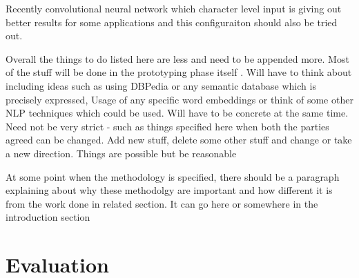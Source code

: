 \documentclass[a4paper, 11pt]{article}
\begin{document}
Recently convolutional neural network which character level input is giving out better results for some applications and this configuraiton should also be tried out.






\color{red}
Overall the things to do listed here are less and need to be appended more. Most of the stuff will be done in the prototyping phase itself . Will have to think about including ideas such as using DBPedia or any semantic database which is precisely expressed, Usage of any specific word embeddings or think of some other NLP techniques which could be used. Will have to be concrete at the same time. Need not be very strict - such as things specified here when both the parties agreed can be changed. Add new stuff, delete some other stuff and change or take a new direction. Things are possible but be reasonable

At some point when the methodology is specified, there should be a paragraph explaining about why these methodolgy are important and how different it is from the work done in related section. It can go here or somewhere in the introduction section
\color{black}

\section{Evaluation}
\end{document}
